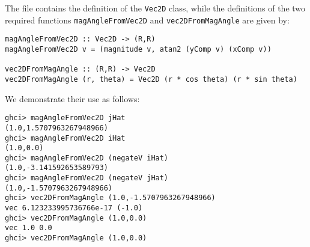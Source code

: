 
The file  contains the definition of the \verb|Vec2D| class,
while the definitions of the two required functions \verb|magAngleFromVec2D| and 
\verb|vec2DFromMagAngle| are given by:
\scriptsize\begin{verbatim}
magAngleFromVec2D :: Vec2D -> (R,R)
magAngleFromVec2D v = (magnitude v, atan2 (yComp v) (xComp v))

vec2DFromMagAngle :: (R,R) -> Vec2D
vec2DFromMagAngle (r, theta) = Vec2D (r * cos theta) (r * sin theta)
\end{verbatim}\normalsize

We demonstrate their use as follows:
\scriptsize\begin{verbatim}
ghci> magAngleFromVec2D jHat
(1.0,1.5707963267948966)
ghci> magAngleFromVec2D iHat
(1.0,0.0)
ghci> magAngleFromVec2D (negateV iHat)
(1.0,-3.141592653589793)
ghci> magAngleFromVec2D (negateV jHat)
(1.0,-1.5707963267948966)
ghci> vec2DFromMagAngle (1.0,-1.5707963267948966)
vec 6.123233995736766e-17 (-1.0) 
ghci> vec2DFromMagAngle (1.0,0.0)
vec 1.0 0.0 
ghci> vec2DFromMagAngle (1.0,0.0)
\end{verbatim}\normalsize
